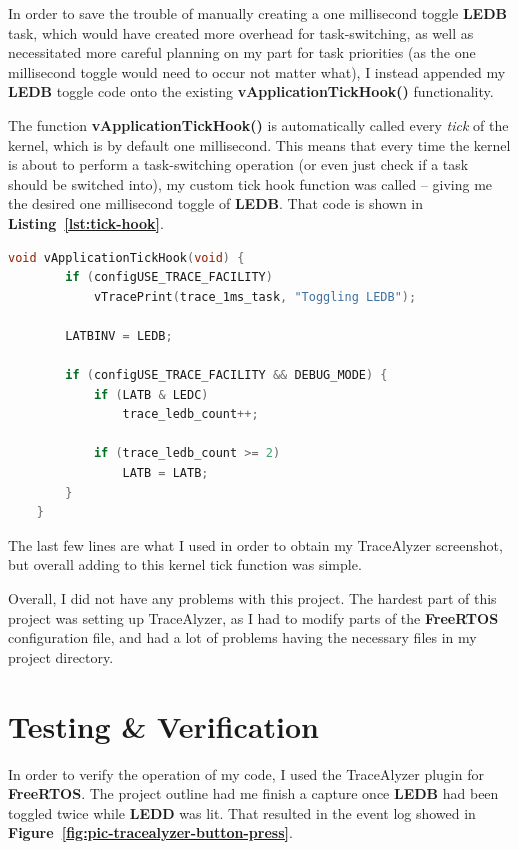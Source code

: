 \documentclass[a4paper, 12pt]{article}
\begin{document}
In order to save the trouble of manually creating a one millisecond toggle \textbf{LEDB} task, which would have created more overhead for task-switching, as well as necessitated more careful planning on my part for task priorities (as the one millisecond toggle would need to occur not matter what), I instead appended my \textbf{LEDB} toggle code onto the existing \textbf{vApplicationTickHook()} functionality.

The function \textbf{vApplicationTickHook()} is automatically called every \textit{tick} of the kernel, which is by default one millisecond. This means that every time the kernel is about to perform a task-switching operation (or even just check if a task should be switched into), my custom tick hook function was called -- giving me the desired one millisecond toggle of \textbf{LEDB}. That code is shown in \textbf{Listing~\ref{lst:tick-hook}}.

\begin{mdframed}[backgroundcolor=code-gray, roundcorner=10pt,
								innerleftmargin=5, innertopmargin=5, innerbottommargin=5]	
	\begin{lstlisting}[language=C, caption=Tick Hook 'Task', tabsize=2, label={lst:tick-hook}]
	void vApplicationTickHook(void) {
		if (configUSE_TRACE_FACILITY) 
			vTracePrint(trace_1ms_task, "Toggling LEDB");
	
		LATBINV = LEDB;
	
		if (configUSE_TRACE_FACILITY && DEBUG_MODE) {
			if (LATB & LEDC)
				trace_ledb_count++;
	
			if (trace_ledb_count >= 2)
				LATB = LATB;
		}
	}
	\end{lstlisting}
	\end{mdframed}
	
The last few lines are what I used in order to obtain my TraceAlyzer screenshot, but overall adding to this kernel tick function was simple. 

Overall, I did not have any problems with this project. The hardest part of this project was setting up TraceAlyzer, as I had to modify parts of the \textbf{FreeRTOS} configuration file, and had a lot of problems having the necessary files in my project directory.
 
\section{Testing \& Verification}
In order to verify the operation of my code, I used the TraceAlyzer plugin for \textbf{FreeRTOS}. The project outline had me finish a capture once \textbf{LEDB} had been toggled twice while \textbf{LEDD} was lit. That resulted in the event log showed in \textbf{Figure~\ref{fig:pic-tracealyzer-button-press}}.
\end{document}
